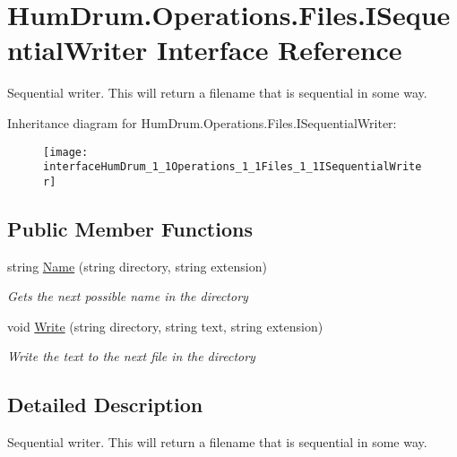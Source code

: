 \hypertarget{interfaceHumDrum_1_1Operations_1_1Files_1_1ISequentialWriter}{}\section{Hum\+Drum.\+Operations.\+Files.\+I\+Sequential\+Writer Interface Reference}
\label{interfaceHumDrum_1_1Operations_1_1Files_1_1ISequentialWriter}


Sequential writer. This will return a filename that is sequential in some way.  


Inheritance diagram for Hum\+Drum.\+Operations.\+Files.\+I\+Sequential\+Writer\+:\begin{figure}[H]
\begin{center}
\leavevmode
\texttt{[image: interfaceHumDrum\_1\_1Operations\_1\_1Files\_1\_1ISequentialWriter]}
\end{center}
\end{figure}
\subsection*{Public Member Functions}
\begin{DoxyCompactItemize}
\item 
string \hyperlink{interfaceHumDrum_1_1Operations_1_1Files_1_1ISequentialWriter_aa8afc6673f6dfcc48a30732f2a6d7fa9}{Name} (string directory, string extension)
\begin{DoxyCompactList}\small\item\em Gets the next possible name in the directory \end{DoxyCompactList}\item 
void \hyperlink{interfaceHumDrum_1_1Operations_1_1Files_1_1ISequentialWriter_ab9c1a57dd13d995dd5fdc35103071183}{Write} (string directory, string text, string extension)
\begin{DoxyCompactList}\small\item\em Write the text to the next file in the directory \end{DoxyCompactList}\end{DoxyCompactItemize}


\subsection{Detailed Description}
Sequential writer. This will return a filename that is sequential in some way. 



